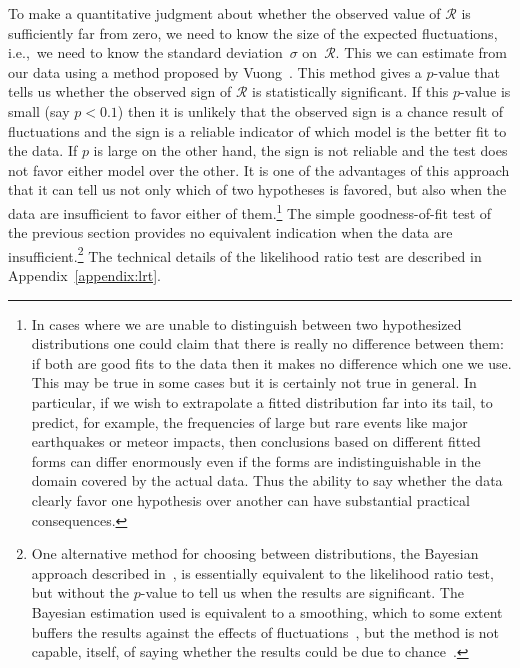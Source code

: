 \documentclass[final]{siamltex}
\begin{document}
To make a quantitative judgment about whether the observed value of
$\mathcal{R}$ is sufficiently far from zero, we need to know the size of
the expected fluctuations, i.e.,~we need to know the standard
deviation~$\sigma$ on~$\mathcal{R}$.  This we can estimate from our data
using a method proposed by
Vuong~\cite{Vuong-testing-non-nested-hypotheses}.  This method gives a
$p$-value that tells us whether the observed sign of $\mathcal{R}$ is
statistically significant.  If this $p$-value is small (say $p<0.1$) then
it is unlikely that the observed sign is a chance result of fluctuations
and the sign is a reliable indicator of which model is the better fit to
the data.  If $p$ is large on the other hand, the sign is not reliable and
the test does not favor either model over the other.  It is one of the
advantages of this approach that it can tell us not only which of two
hypotheses is favored, but also when the data are insufficient to favor
either of them.\footnote{In cases where we are unable to distinguish between
 two hypothesized distributions one could claim that there is really no
 difference between them: if both are good fits to the data then it makes
 no difference which one we use.  This may be true in some cases but it is
 certainly not true in general.  In particular, if we wish to extrapolate
 a fitted distribution far into its tail, to predict, for example, the
 frequencies of large but rare events like major earthquakes or meteor
 impacts, then conclusions based on different fitted forms can differ
 enormously even if the forms are indistinguishable in the domain covered
 by the actual data.  Thus the ability to say whether the data clearly
 favor one hypothesis over another can have substantial practical
 consequences.}  The simple goodness-of-fit test of the previous section
provides no equivalent indication when the data are
insufficient.\footnote{One alternative method for choosing between
 distributions, the Bayesian approach described
 in~\cite{Stouffer-Malmgren-Amaral-on-Barabasi}, is essentially equivalent
 to the likelihood ratio test, but without the $p$-value to tell us when
 the results are significant.  The Bayesian estimation used is equivalent
 to a smoothing, which to some extent buffers the results against the
 effects of fluctuations~\cite{CRS-bayes-as-evol}, but the method is not
 capable, itself, of saying whether the results could be due to
 chance~\cite{Mayo-error,Wasserman-in-Bayesian-Analysis}.}  The technical
details of the likelihood ratio test are described in
Appendix~\ref{appendix:lrt}.
\end{document}
